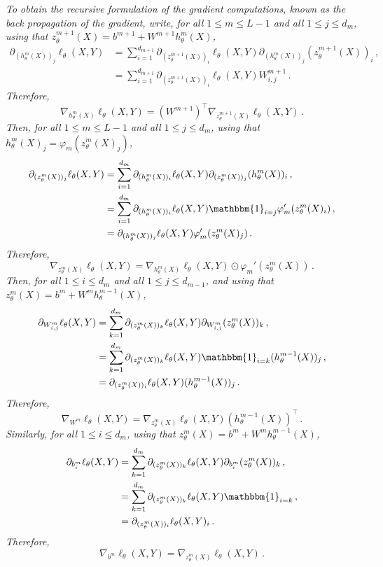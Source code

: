 \documentclass[a4paper,10pt,fleqn]{article}
\newcommand{\eqsp}{\,}
\newcommand{\1}{\ensuremath{\mathbbm{1}}}
\begin{document}
\begin{enumerate}
{\em
To obtain the recursive formulation of the gradient computations, known as the {\em back propagation} of the gradient, write, for all $1\leqslant m \leqslant L-1$ and all $1\leqslant j \leqslant d_m$,   using that $z_{\theta}^{m+1}(X) = b^{m+1} + W^{m+1}h_{\theta}^{m}(X)$,
\begin{align*}
\partial_{(h_{\theta}^m(X))_j}\ell_{\theta}(X,Y) &=  \sum_{i=1}^{d_{m+1}} \partial_{(z_{\theta}^{m+1}(X))_i}\ell_{\theta}(X,Y)\partial_{(h_{\theta}^m(X))_j}(z_{\theta}^{m+1}(X))_i\eqsp,\\
&=  \sum_{i=1}^{d_{m+1}} \partial_{(z_{\theta}^{m+1}(X))_i}\ell_{\theta}(X,Y)W^{m+1}_{i,j}\eqsp.
\end{align*}
Therefore,
$$
\nabla_{h_{\theta}^m(X)} \ell_{\theta}(X,Y) = (W^{m+1})^\top\nabla_{z_{\theta}^{m+1}(X)} \ell_{\theta}(X,Y) \eqsp.
$$
Then, for all $1\leqslant m \leqslant L-1$ and all $1\leqslant j \leqslant d_m$,  using that $h_{\theta}^{m}(X)_j =\varphi_m(z_{\theta}^{m}(X)_j)$,
\begin{align*}
\partial_{(z_{\theta}^m(X))_j}\ell_{\theta}(X,Y) &=  \sum_{i=1}^{d_{m}} \partial_{(h_{\theta}^m(X))_i}\ell_{\theta}(X,Y)\partial_{(z_{\theta}^m(X))_j}(h_{\theta}^m(X))_i\eqsp,\\
&=  \sum_{i=1}^{d_{m}} \partial_{(h_{\theta}^m(X))_i}\ell_{\theta}(X,Y) \1_{i=j}\varphi_m'(z_{\theta}^{m}(X)_i)\eqsp,\\
&= \partial_{(h_{\theta}^m(X))_j}\ell_{\theta}(X,Y) \varphi_m'(z_{\theta}^{m}(X)_j)\eqsp.
\end{align*}
Therefore,
$$
\nabla_{z_{\theta}^m(X)} \ell_{\theta}(X,Y) = \nabla_{h_{\theta}^m(X)}\ell_{\theta}(X,Y) \odot \varphi_m'(z_{\theta}^{m}(X))\eqsp.
$$
Then, for all $1\leqslant i\leqslant d_m$ and all $1\leqslant j \leqslant d_{m-1}$, and using that $z_{\theta}^m(X) = b^m + W^mh_{\theta}^{m-1}(X)$,
\begin{align*}
\partial_{W^m_{i,j}}\ell_{\theta}(X,Y) &=  \sum_{k=1}^{d_m} \partial_{(z_{\theta}^m(X))_k}\ell_{\theta}(X,Y)\partial_{W^m_{i,j}}(z_{\theta}^m(X))_k\eqsp,\\
&=  \sum_{k=1}^{d_m} \partial_{(z_{\theta}^m(X))_k}\ell_{\theta}(X,Y)\1_{i=k}(h_{\theta}^{m-1}(X))_j\eqsp,\\
&=  \partial_{(z_{\theta}^m(X))_i}\ell_{\theta}(X,Y)(h_{\theta}^{m-1}(X))_j\eqsp.
\end{align*}
Therefore,
$$
\nabla_{W^m} \ell_{\theta}(X,Y) = \nabla_{z_{\theta}^m(X)}\ell_{\theta}(X,Y)(h_{\theta}^{m-1}(X))^\top\eqsp.
$$
Similarly, for all $1\leqslant i\leqslant d_m$,  using that $z_{\theta}^m(X) = b^m + W^mh_{\theta}^{m-1}(X)$,
\begin{align*}
\partial_{b^m_{i}}\ell_{\theta}(X,Y) &=  \sum_{k=1}^{d_m} \partial_{(z_{\theta}^m(X))_k}\ell_{\theta}(X,Y)\partial_{b^m_{i}}(z_{\theta}^m(X))_k\eqsp,\\
&=  \sum_{k=1}^{d_m} \partial_{(z_{\theta}^m(X))_k}\ell_{\theta}(X,Y)\1_{i=k}\eqsp,\\
&=  \partial_{(z_{\theta}^m(X))_i}\ell_{\theta}(X,Y)_i\eqsp.
\end{align*}
Therefore,
$$
\nabla_{b^m} \ell_{\theta}(X,Y) =  \nabla_{z_{\theta}^m(X)}\ell_{\theta}(X,Y)\eqsp.
$$
}

\end{enumerate}
\end{document}
